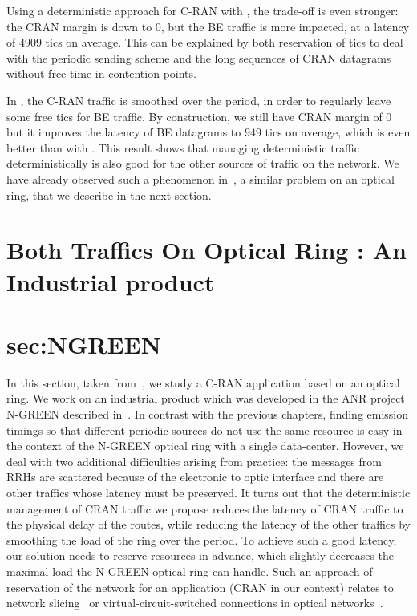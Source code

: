      Using a deterministic approach for C-RAN with \PMLS, the trade-off is even stronger:
      the CRAN margin is down to $0$, but the BE traffic is more impacted, at a latency of $4909$ tics on average. This can be explained by both reservation of tics to deal with the periodic sending scheme and the long sequences of CRAN datagrams without free time in contention points.
     
     In \SPMLS, the C-RAN traffic is smoothed over the period, in order to regularly leave some free tics for BE traffic. By construction, we still have CRAN margin of $0$ but it improves the latency of 
     BE datagrams to $949$ tics on average, which is even better than with \FIFO. 
     This result shows that managing deterministic traffic deterministically is also good for the other sources of traffic on the network. We have already observed such a phenomenon in~\cite{DBLP:conf/ondm/BarthGS19}, a similar 
     problem on an optical ring, that we describe in the next section.
     
   


\section{Both Traffics On Optical Ring : An Industrial product}
\section{sec:NGREEN}

In this section, taken from~\cite{DBLP:conf/ondm/BarthGS19}, we study a C-RAN application based on an optical ring. We work on an industrial product which was developed in the ANR project N-GREEN described in~\cite{ngreenarchitecture,uscumlic2018scalable}.
In contrast with the previous chapters, finding emission timings so that different periodic sources do not use the same resource is easy in the context of the N-GREEN optical ring with a single data-center. However, we deal with two additional difficulties arising from practice: the messages from RRHs are scattered because of the electronic to optic interface and there are other traffics whose latency must be preserved. It turns out that the deterministic management of CRAN traffic we propose reduces the latency of CRAN traffic to the physical delay of the routes, while reducing the latency of the other traffics by smoothing the load of the ring over the period. To achieve such a good latency, our solution needs to reserve resources in advance, which slightly decreases the maximal load the N-GREEN optical ring can handle. Such an approach of reservation of the network for an application (CRAN in our context) relates to network slicing~\cite{jiang2016network} or virtual-circuit-switched connections in optical networks~\cite{cadere2010virtual,szymanski2016ultra}.

